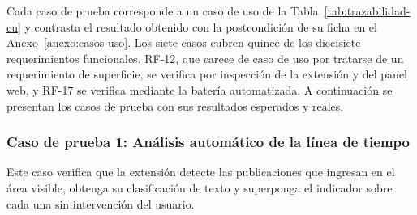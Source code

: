 Cada caso de prueba corresponde a un caso de uso de la Tabla~\ref{tab:trazabilidad-cu} y contrasta el resultado obtenido con la postcondición de su ficha en el Anexo~\ref{anexo:casos-uso}. Los siete casos cubren quince de los diecisiete requerimientos funcionales. RF-12, que carece de caso de uso por tratarse de un requerimiento de superficie, se verifica por inspección de la extensión y del panel web, y RF-17 se verifica mediante la batería automatizada. A continuación se presentan los casos de prueba con sus resultados esperados y reales.

\subsubsection{Caso de prueba 1: Análisis automático de la línea de tiempo}

Este caso verifica que la extensión detecte las publicaciones que ingresan en el área visible, obtenga su clasificación de texto y superponga el indicador sobre cada una sin intervención del usuario.

